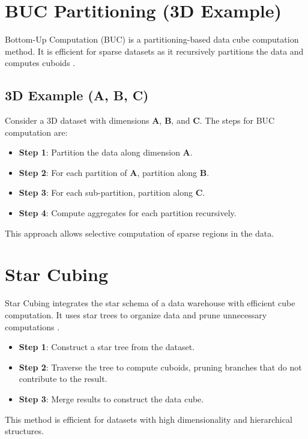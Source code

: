 \documentclass[12pt,a4paper]{article}
\begin{document}
\newpage

\section{BUC Partitioning (3D Example)}
Bottom-Up Computation (BUC) is a partitioning-based data cube computation method. It is efficient for sparse datasets as it recursively partitions the data and computes cuboids \cite{buc1999}.

\subsection*{3D Example (A, B, C)}
Consider a 3D dataset with dimensions \textbf{A}, \textbf{B}, and \textbf{C}. The steps for BUC computation are:

\begin{itemize}
    \item \textbf{Step 1}: Partition the data along dimension \textbf{A}.
    \item \textbf{Step 2}: For each partition of \textbf{A}, partition along \textbf{B}.
    \item \textbf{Step 3}: For each sub-partition, partition along \textbf{C}.
    \item \textbf{Step 4}: Compute aggregates for each partition recursively.
\end{itemize}

This approach allows selective computation of sparse regions in the data.


\section{Star Cubing}
Star Cubing integrates the star schema of a data warehouse with efficient cube computation. It uses star trees to organize data and prune unnecessary computations \cite{han2001star}.

\begin{itemize}
    \item \textbf{Step 1}: Construct a star tree from the dataset.
    \item \textbf{Step 2}: Traverse the tree to compute cuboids, pruning branches that do not contribute to the result.
    \item \textbf{Step 3}: Merge results to construct the data cube.
\end{itemize}

This method is efficient for datasets with high dimensionality and hierarchical structures.
\end{document}
